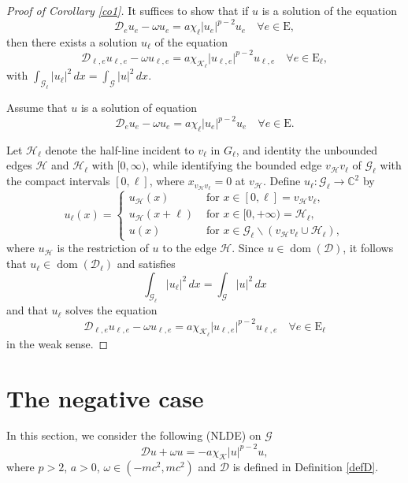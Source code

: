 \documentclass[11pt]{amsart}
\newcommand{\abs}[1]{\lvert#1\rvert}
\newcommand{\D}{\mathcal{D}}
\newcommand{\G}{\mathcal{G}}
\newcommand{\K}{\mathcal{K}}
\numberwithin{equation}{section}
\begin{document}
\begin{proof}[Proof of Corollary \ref{co1}]
It suffices to show that if $u$ is a solution of the equation
\[
\D_e u_e - \omega u_e= a\chi_\ell\abs{u_e}^{p-2}u_e \quad \forall e\in \mathrm{E},
\]
 then there exists a solution $u_\ell$ of the equation
\[
\D_{\ell,e} u_{\ell,e} - \omega u_{\ell,e}= a\chi_{\K_\ell}\abs{u_{\ell,e}}^{p-2}u_{\ell,e} \quad \forall e\in \mathrm{E}_\ell,
\]
with $\int_{\G_\ell}\abs{u_\ell}^2\, dx = \int_{\G}\abs{u}^2\, dx$.

Assume that $u$ is a solution of equation
\[
\D_e u_e - \omega u_e= a\chi_\ell\abs{u_e}^{p-2}u_e\quad \forall e\in \mathrm{E}.
\]


Let $\mathcal{H}_\ell$ denote the half-line incident to $v_\ell$ in $G_\ell$, and identity the unbounded edges $\mathcal{H}$ and $\mathcal{H}_\ell$ with $[0,\infty)$, while identifying the bounded edge $v_\mathcal{H}v_\ell$ of $\G_\ell$ with the compact intervals $[0,\ell]$, where $x_{v_\mathcal{H}v_\ell}=0$ at $v_\mathcal{H}$. Define $u_\ell: \G_\ell \to \mathbb{C}^2$ by
$$
    u_\ell(x)= \begin{cases}u_{\mathcal{H}}(x) & \text { for }  x\in [0,\ell] = v_\mathcal{H}v_\ell, \\u_{\mathcal{H}}(x+\ell) & \text { for } x \in [0,+\infty)=\mathcal{H}_\ell,\\u(x)& \text { for } x \in \G_\ell\backslash(v_\mathcal{H}v_\ell \cup \mathcal{H}_\ell), \end{cases}
$$
where $u_{\mathcal{H}}$ is the restriction of $u$ to the edge ${\mathcal{H}}$. Since $u \in \operatorname{dom}(\D)$, it follows that $u_\ell \in \operatorname{dom}(\D_\ell)$ and satisfies
$$\int_{\G_\ell}\abs{u_\ell}^2\, dx = \int_{\G}\abs{u}^2\, dx$$
 and that $u_\ell$ solves the equation
\[
\D_{\ell,e} u_{\ell,e} - \omega u_{\ell,e}= a\chi_{\K_\ell}\abs{u_{\ell,e}}^{p-2}u_{\ell,e} \quad \forall e\in \mathrm{E}_\ell
\]
in the weak sense.
\end{proof}

\section{The negative case}\label{sectnegative}
In this section, we consider the following (NLDE) on $\G$
\begin{equation}
\label{eq-a}
    \D u + \omega u= -a\chi_\K\abs{u}^{p-2}u,
\end{equation}
where $p > 2$, $a > 0$, $\omega\in (-mc^2,mc^2)$ and $\D$ is defined in Definition \ref{defD}.
\end{document}
